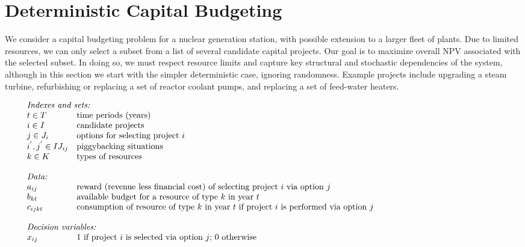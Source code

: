 \section{Deterministic Capital Budgeting}
\label{sec:DeterministicCapitalBudgeting}

We consider a capital budgeting problem for a nuclear generation station, with possible extension to
a larger fleet of plants. Due to limited resources, we can only select a subset from a list of
several candidate capital projects. Our goal is to maximize overall NPV associated with the
selected subset. In doing so, we must respect resource limits and capture key structural and
stochastic dependencies of the system, although in this section we start with the simpler
deterministic case, ignoring randomness.  Example projects include upgrading a steam turbine,
refurbishing or replacing a set of reactor coolant pumps, and replacing a set of feed-water heaters.

\[
\begin{array}{ll}
\multicolumn{2}{l}{\mbox{\em Indexes and sets:} } \\
t \in T  & \mbox{time periods (years)} \\
i \in I  & \mbox{candidate projects} \\
j \in J_{i}	& \mbox{options for selecting project $i$} \\%
i^{'},j^{'} \in IJ_{ij} & \mbox{piggybacking situations} \\%
k \in K	& \mbox{types of resources} \\%
\\
\multicolumn{2}{l}{\mbox{\em Data:}} \\
a_{ij} & \mbox{reward (revenue less financial cost) of selecting project $i$ via option $j$}  \\
b_{kt} & \mbox{available budget for a resource of type $k$ in year $t$}\\
c_{ijkt}  & \mbox{consumption of resource of type $k$ in year $t$ if project $i$ is performed via option $j$} \\
\\
\multicolumn{2}{l}{\mbox{\em Decision variables:}}  \\
x_{ij} & \mbox{1 if project $i$ is selected via option $j$; 0 otherwise} \hspace*{4.0in}\\
\end{array}
\]

